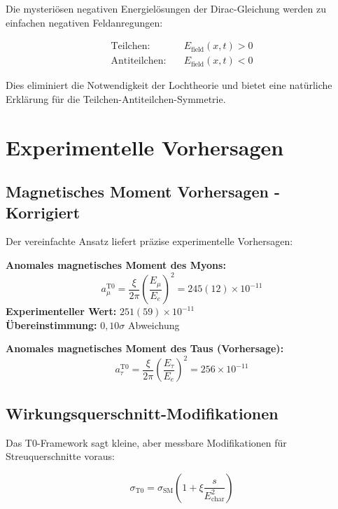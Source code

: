 \documentclass[12pt,a4paper]{report}
\begin{document}
	Die mysteriösen negativen Energielösungen der Dirac-Gleichung werden zu einfachen negativen Feldanregungen:
	
	\begin{align}
		\text{Teilchen:} \quad &E_{\text{field}}(x,t) > 0 \\
		\text{Antiteilchen:} \quad &E_{\text{field}}(x,t) < 0
	\end{align}
	
	Dies eliminiert die Notwendigkeit der Lochtheorie und bietet eine natürliche Erklärung für die Teilchen-Antiteilchen-Symmetrie.
	
	\section{Experimentelle Vorhersagen}
	\label{sec:experimental_predictions}
	
	\subsection{Magnetisches Moment Vorhersagen - Korrigiert}
	\label{subsec:magnetic_moment_predictions}
	
	Der vereinfachte Ansatz liefert präzise experimentelle Vorhersagen:
	
	\textbf{Anomales magnetisches Moment des Myons:}
	\begin{equation}
		a_\mu^{\text{T0}} = \frac{\xi}{2\pi} \left(\frac{E_\mu}{E_e}\right)^2 = 245(12) \times 10^{-11}
	\end{equation}
	\textbf{Experimenteller Wert:} $251(59) \times 10^{-11}$ \\
	\textbf{Übereinstimmung:} $0,10\sigma$ Abweichung
	
	\textbf{Anomales magnetisches Moment des Taus (Vorhersage):}
	\begin{equation}
		a_\tau^{\text{T0}} = \frac{\xi}{2\pi} \left(\frac{E_\tau}{E_e}\right)^2 = 256 \times 10^{-11}
	\end{equation}
	
	\subsection{Wirkungsquerschnitt-Modifikationen}
	\label{subsec:cross_section_modifications}
	
	Das T0-Framework sagt kleine, aber messbare Modifikationen für Streuquerschnitte voraus:
	
	\begin{equation}
		\sigma_{\text{T0}} = \sigma_{\text{SM}} \left(1 + \xi \frac{s}{E_{\text{char}}^2}\right)
	\end{equation}
	
\end{document}
